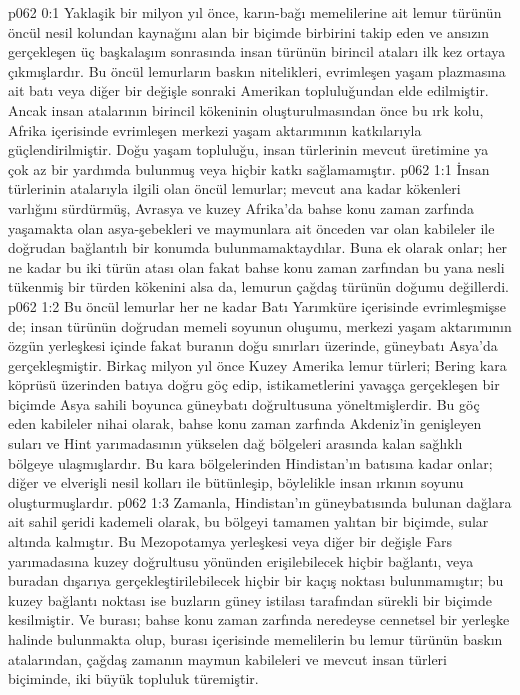 \vs p062 0:1 Yaklaşik bir milyon yıl önce, karın\hyp{}bağı memelilerine ait lemur türünün öncül nesil kolundan kaynağını alan bir biçimde birbirini takip eden ve ansızın gerçekleşen üç başkalaşım sonrasında insan türünün birincil ataları ilk kez ortaya çıkmışlardır. Bu öncül lemurların baskın nitelikleri, evrimleşen yaşam plazmasına ait batı veya diğer bir değişle sonraki Amerikan topluluğundan elde edilmiştir. Ancak insan atalarının birincil kökeninin oluşturulmasından önce bu ırk kolu, Afrika içerisinde evrimleşen merkezi yaşam aktarımının katkılarıyla güçlendirilmiştir. Doğu yaşam topluluğu, insan türlerinin mevcut üretimine ya çok az bir yardımda bulunmuş veya hiçbir katkı sağlamamıştır.
\vs p062 1:1 İnsan türlerinin atalarıyla ilgili olan öncül lemurlar; mevcut ana kadar kökenleri varlığını sürdürmüş, Avrasya ve kuzey Afrika’da bahse konu zaman zarfında yaşamakta olan asya\hyp{}şebekleri ve maymunlara ait önceden var olan kabileler ile doğrudan bağlantılı bir konumda bulunmamaktaydılar. Buna ek olarak onlar; her ne kadar bu iki türün atası olan fakat bahse konu zaman zarfından bu yana nesli tükenmiş bir türden kökenini alsa da, lemurun çağdaş türünün doğumu değillerdi.
\vs p062 1:2 Bu öncül lemurlar her ne kadar Batı Yarımküre içerisinde evrimleşmişse de; insan türünün doğrudan memeli soyunun oluşumu, merkezi yaşam aktarımının özgün yerleşkesi içinde fakat buranın doğu sınırları üzerinde, güneybatı Asya’da gerçekleşmiştir. Birkaç milyon yıl önce Kuzey Amerika lemur türleri; Bering kara köprüsü üzerinden batıya doğru göç edip, istikametlerini yavaşça gerçekleşen bir biçimde Asya sahili boyunca güneybatı doğrultusuna yöneltmişlerdir. Bu göç eden kabileler nihai olarak, bahse konu zaman zarfında Akdeniz’in genişleyen suları ve Hint yarımadasının yükselen dağ bölgeleri arasında kalan sağlıklı bölgeye ulaşmışlardır. Bu kara bölgelerinden Hindistan’ın batısına kadar onlar; diğer ve elverişli nesil kolları ile bütünleşip, böylelikle insan ırkının soyunu oluşturmuşlardır.
\vs p062 1:3 Zamanla, Hindistan’ın güneybatısında bulunan dağlara ait sahil şeridi kademeli olarak, bu bölgeyi tamamen yalıtan bir biçimde, sular altında kalmıştır. Bu Mezopotamya yerleşkesi veya diğer bir değişle Fars yarımadasına kuzey doğrultusu yönünden erişilebilecek hiçbir bağlantı, veya buradan dışarıya gerçekleştirilebilecek hiçbir bir kaçış noktası bulunmamıştır; bu kuzey bağlantı noktası ise buzların güney istilası tarafından sürekli bir biçimde kesilmiştir. Ve burası; bahse konu zaman zarfında neredeyse cennetsel bir yerleşke halinde bulunmakta olup, burası içerisinde memelilerin bu lemur türünün baskın atalarından, çağdaş zamanın maymun kabileleri ve mevcut insan türleri biçiminde, iki büyük topluluk türemiştir.
